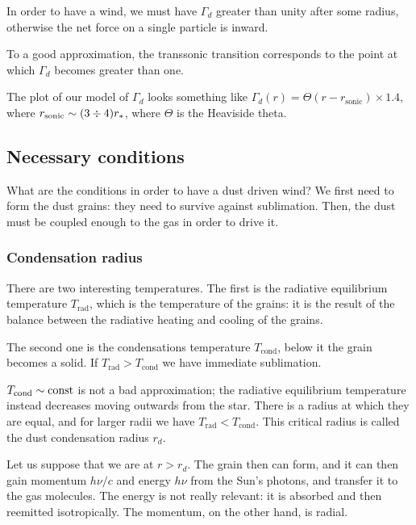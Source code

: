 \documentclass[main.tex]{subfiles}
\begin{document}
In order to have a wind, we must have \(\Gamma_{d}\) greater than unity after some radius, otherwise the net force on a single particle is inward.

To a good approximation, the transsonic transition corresponds to the point at which \(\Gamma_{d}\) becomes greater than one. 

The plot of our model of \(\Gamma_{d}\) looks something like \(\Gamma_{d} (r) = \Theta (r - r _{\text{sonic}}) \times 1.4\), where \(r _{\text{sonic}} \sim (3 \divisionsymbol 4) r_{*}\), where \(\Theta \) is the Heaviside theta.

\subsection{Necessary conditions}

What are the conditions in order to have a dust driven wind? We first need to form the dust grains: they need to survive against sublimation. 
Then, the dust must be coupled enough to the gas in order to drive it. 

\subsubsection{Condensation radius}

There are two interesting temperatures. The first is the radiative equilibrium temperature \(T _{\text{rad}}\), which is the temperature of the grains: it is the result of the balance between the radiative heating and cooling of the grains. 

The second one is the condensations temperature \(T _{\text{cond}}\), below it the grain becomes a solid. 
If \(T _{\text{rad}} >  T _{\text{cond}}\) we have  immediate sublimation.

\(T _{\text{cond}} \sim \text{const}\) is not a bad approximation; the radiative equilibrium temperature instead decreases moving outwards from the star. 
There is a radius at which they are equal, and for larger radii we have \(T _{\text{rad}} < T _{\text{cond}}\). 
This critical radius is called the dust condensation radius \(r_{d}\). 

Let us suppose that we are at \(r > r_d\). 
The grain then can form, and it can then gain momentum \(h \nu /c\) and energy \(h \nu \) from the Sun's photons, and transfer it to the gas molecules. 
The energy is not really relevant: it is absorbed and then reemitted isotropically. The momentum, on the other hand, is radial.
\end{document}

